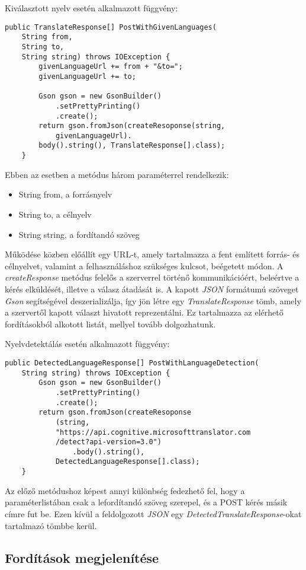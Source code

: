 Kiválasztott nyelv esetén alkalmazott függvény:
\begin{verbatim}
public TranslateResponse[] PostWithGivenLanguages(
    String from,
    String to,
    String string) throws IOException {
        givenLanguageUrl += from + "&to=";
        givenLanguageUrl += to;

        Gson gson = new GsonBuilder()
            .setPrettyPrinting()
            .create();
        return gson.fromJson(createResoponse(string,
            givenLanguageUrl).
        body().string(), TranslateResponse[].class);
    }
\end{verbatim}
Ebben az esetben a metódus három paraméterrel rendelkezik:
\begin{itemize}[noitemsep]
\item String from, a forrásnyelv
\item String to, a célnyelv
\item String string, a fordítandó szöveg
\end{itemize}
Működése közben előállít egy URL-t, amely tartalmazza a fent említett forrás- és célnyelvet, valamint a felhasználáshoz szükséges kulcsot, beégetett módon. A \textit{createResponse} metódus felelős a szerverrel történő kommunikációért, beleértve a kérés elküldését, illetve a válasz átadását is. A kapott \textit{JSON} formátumú szöveget \textit{Gson} segítségével deszerializálja, így jön létre egy \textit{TranslateResponse} tömb, amely a szervertől kapott választ hivatott reprezentálni. Ez tartalmazza az elérhető fordításokból alkotott listát, mellyel tovább dolgozhatunk.

Nyelvdetektálás esetén alkalmazott függvény:
\begin{verbatim}
public DetectedLanguageResponse[] PostWithLanguageDetection(
    String string) throws IOException {
        Gson gson = new GsonBuilder()
            .setPrettyPrinting()
            .create();
        return gson.fromJson(createResoponse
            (string,
            "https://api.cognitive.microsofttranslator.com
            /detect?api-version=3.0")
                .body().string(),
            DetectedLanguageResponse[].class);
    }
\end{verbatim}
Az előző metódushoz képest annyi különbség fedezhető fel, hogy a paraméterlistában csak a lefordítandó szöveg szerepel, és a POST kérés másik címre fut be. Ezen kívül a feldolgozott \textit{JSON} egy \textit{DetectedTranslateResponse}-okat tartalmazó tömbbe kerül. 

\subsection{Fordítások megjelenítése}
